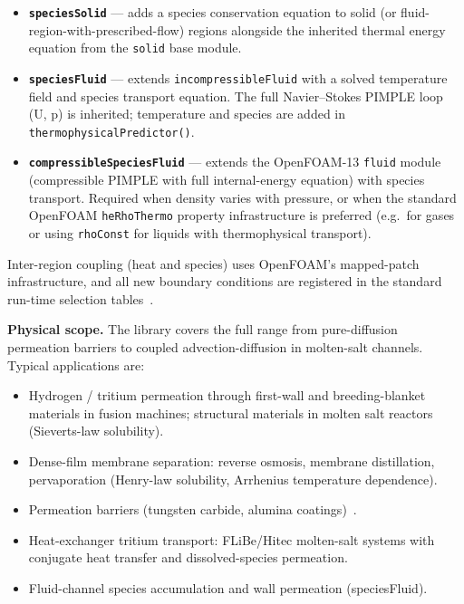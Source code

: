 \documentclass[11pt,a4paper]{article}
\begin{document}
\begin{itemize}[itemsep=2pt]
  \item \textbf{\texttt{speciesSolid}} — adds a species conservation equation to solid
        (or fluid-region-with-prescribed-flow) regions alongside the inherited thermal
        energy equation from the \texttt{solid} base module.
  \item \textbf{\texttt{speciesFluid}} — extends \texttt{incompressibleFluid} with a
        solved temperature field and species transport equation.  The full
        Navier--Stokes PIMPLE loop (U, p) is inherited; temperature and species
        are added in \texttt{thermophysicalPredictor()}.
  \item \textbf{\texttt{compressibleSpeciesFluid}} — extends the OpenFOAM-13
        \texttt{fluid} module (compressible PIMPLE with full internal-energy
        equation) with species transport.  Required when density varies with
        pressure, or when the standard OpenFOAM \texttt{heRhoThermo} property
        infrastructure is preferred (e.g.\ for gases or using \texttt{rhoConst}
        for liquids with thermophysical transport).
\end{itemize}

Inter-region coupling (heat and species) uses OpenFOAM's mapped-patch
infrastructure, and all new boundary conditions are registered in the
standard run-time selection tables~\cite{Hattab2024}.

\textbf{Physical scope.}
The library covers the full range from pure-diffusion permeation barriers to
coupled advection-diffusion in molten-salt channels.  Typical applications are:

\begin{itemize}[itemsep=2pt]
  \item Hydrogen / tritium permeation through first-wall and breeding-blanket
        materials in fusion machines; structural materials in molten salt
        reactors (Sieverts-law solubility).
  \item Dense-film membrane separation: reverse osmosis, membrane distillation,
        pervaporation (Henry-law solubility, Arrhenius temperature dependence).
  \item Permeation barriers (tungsten carbide, alumina coatings)~\cite{Anderl1992}.
  \item Heat-exchanger tritium transport: FLiBe/Hitec molten-salt systems with
        conjugate heat transfer and dissolved-species permeation.
  \item Fluid-channel species accumulation and wall permeation (speciesFluid).
\end{itemize}
\end{document}
